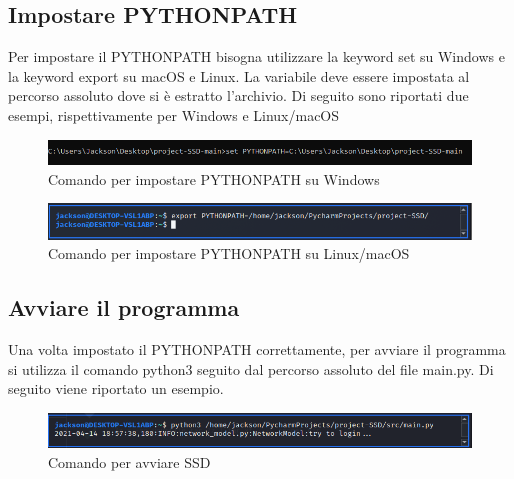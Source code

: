\subsection{Impostare PYTHONPATH}
Per impostare il PYTHONPATH bisogna utilizzare la keyword set su Windows e la keyword export su macOS e Linux. La variabile deve essere impostata al percorso assoluto dove si è estratto l'archivio.
Di seguito sono riportati due esempi, rispettivamente per Windows e Linux/macOS
\begin{figure}[H]
    \centering
    \includegraphics[scale = 0.65]{components/img/Windows-istruzione-1.png}
    \caption{Comando per impostare PYTHONPATH su Windows}
    \label{fig:comando per impostare PYTHONPATH su windows}
\end{figure}
\begin{figure}[H]
    \centering
    \includegraphics[scale = 0.50]{components/img/linux-istruzione-1.jpg}
    \caption{ Comando per impostare PYTHONPATH su Linux/macOS}
    \label{fig:comando per impostare PYTHONPATH su windows}
\end{figure}
\subsection{Avviare il programma}
Una volta impostato il PYTHONPATH correttamente, per avviare il programma si utilizza il comando python3 seguito dal percorso assoluto del file main.py. Di seguito viene riportato un esempio.
\begin{figure}[H]
    \centering
    \includegraphics[scale = 0.50]{components/img/avvio.png}
    \caption{Comando per avviare SSD}
    \label{fig:comando per impostare PYTHONPATH su windows}
\end{figure}
